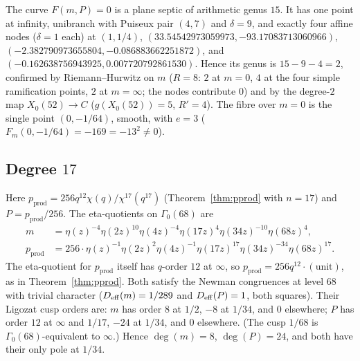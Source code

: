 \documentclass[11pt]{amsart}
\theoremstyle{plain}
\theoremstyle{definition}
\theoremstyle{remark}
\newcommand{\pprod}{p_{\mathrm{prod}}}
\begin{document}
The curve $F(m,P) = 0$ is a plane septic of arithmetic genus $15$. It has one
point at infinity, unibranch with Puiseux pair $(4,7)$ and $\delta = 9$, and
exactly four affine nodes ($\delta = 1$ each) at $(1,1/4)$,
$(33.54542973059973, -93.17083713060966)$,
$(-2.382790973655804, -0.086883662251872)$, and
$(-0.162638756943925, 0.007720792861530)$. Hence its genus is $15 - 9 - 4 = 2$,
confirmed by Riemann--Hurwitz on $m$ ($R = 8$: $2$ at $m = 0$, $4$ at the four
simple ramification points, $2$ at $m = \infty$; the nodes contribute $0$) and
by the degree-$2$ map $X_0(52) \to C$ ($g(X_0(52)) = 5$, $R' = 4$). The fibre
over $m = 0$ is the single point $(0,-1/64)$, smooth, with $e = 3$
($F_m(0,-1/64) = -169 = -13^2 \ne 0$).

\subsection{Degree $17$}

Here $\pprod = 256q^{12}\chi(q)/\chi^{17}(q^{17})$ (Theorem~\ref{thm:pprod}
with $n = 17$) and $P = \pprod/256$. The eta-quotients on $\Gamma_0(68)$ are
\begin{align}
m &= \eta(z)^{-4}\eta(2z)^{10}\eta(4z)^{-4}\eta(17z)^4\eta(34z)^{-10}\eta(68z)^4, \\
\pprod &= 256\cdot\eta(z)^{-1}\eta(2z)^2\eta(4z)^{-1}\eta(17z)^{17}
\eta(34z)^{-34}\eta(68z)^{17}.
\end{align}
The eta-quotient for $\pprod$ itself has $q$-order $12$ at $\infty$, so
$\pprod = 256q^{12}\cdot(\text{unit})$, as in Theorem~\ref{thm:pprod}.
Both satisfy the Newman congruences at level $68$ with trivial character
($D_{\rm eff}(m) = 1/289$ and $D_{\rm eff}(P) = 1$, both squares). Their
Ligozat cusp orders are: $m$ has order $8$ at $1/2$, $-8$ at $1/34$, and $0$
elsewhere; $P$ has order $12$ at $\infty$ and $1/17$, $-24$ at $1/34$,
and $0$ elsewhere. (The cusp $1/68$ is $\Gamma_0(68)$-equivalent to $\infty$.)
Hence $\deg(m) = 8$, $\deg(P) = 24$, and both have their
only pole at $1/34$.
\end{document}
